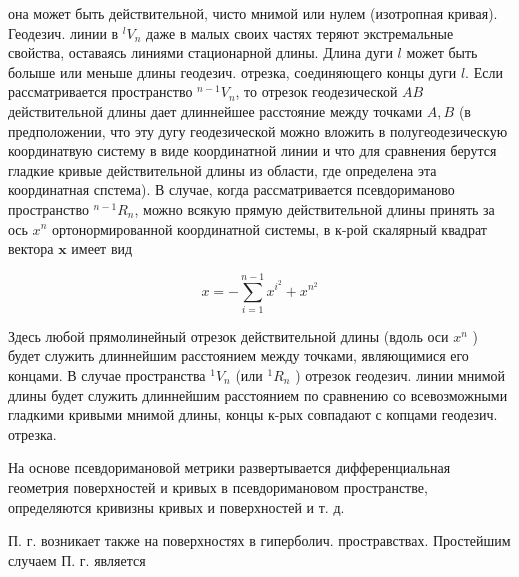 \documentclass[10pt]{article}
\begin{document}
она может быть действительной, чисто мнимой или нулем (изотропная кривая). Геодезич. линии в ${ }^{l} V_{n}$ даже в малых своих частях теряют экстремальные свойства, оставаясь линиями стационарной длины. Длина дуги $l$ может быть болыше или меньше длины геодезич. отрезка, соединяющего концы дуги $l$. Если рассматривается пространство ${ }^{n-1} V_{n}$, то отрезок геодезической $A B$ действительной длины дает длиннейшее расстояние между точками $A, B$ (в предположении, что эту дугу геодезической можно вложить в полугеодезическую координатвую систему в виде координатной линии и что для сравнения берутся гладкие кривые действительной длины из области, где определена эта координатная спстема). В случае, когда рассматривается псевдориманово пространство ${ }^{n-1} R_{n}$, можно всякую прямую действительной длины принять за ось $x^{n}$ ортонормированной координатной системы, в к-рой скалярный квадрат вектора $\boldsymbol{x}$ имеет вид



\[

x=-\sum_{i=1}^{n-1} x^{i^{2}}+x^{n^{2}}

\]



Здесь любой прямолинейный отрезок действительной длины (вдоль оси $x^{n}$ ) будет служить длиннейшим расстоянием между точками, являющимися его концами. В случае пространства ${ }^{1} V_{n}$ (или ${ }^{1} R_{n}$ ) отрезок геодезич. линии мнимой длины будет служить длиннейшим расстоянием по сравнению со всевозможными гладкими кривыми мнимой длины, концы к-рых совпадают с копцами геодезич. отрезка.



На основе псевдоримановой метрики развертывается дифференциальная геометрия поверхностей и кривых в псевдоримановом пространстве, определяются кривизны кривых и поверхностей и т. д.



П. г. возникает также на поверхностях в гиперболич. простравствах. Простейшим случаем П. г. является
\end{document}
